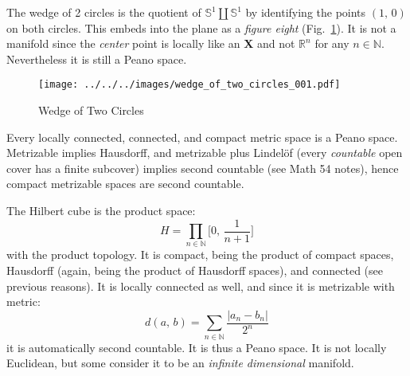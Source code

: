 \documentclass{article}
\theoremstyle{plain}
\theoremstyle{normal}
\newenvironment{example}{%
    \pushQED{\qed}\renewcommand{\qedsymbol}{$\blacksquare$}\examplex%
}{%
    \popQED\endexamplex%
}
\begin{document}
        \begin{example}
            The wedge of 2 circles is the quotient of
            $\mathbb{S}^{1}\coprod\mathbb{S}^{1}$ by identifying the points
            $(1,\,0)$ on both circles. This embeds into the plane as a
            \textit{figure eight} (Fig.~\ref{fig:wedge_of_two_circles_001}).
            It is not a manifold since the \textit{center} point is locally
            like an \textbf{X} and not $\mathbb{R}^{n}$ for any
            $n\in\mathbb{N}$. Nevertheless it is still a Peano space.
        \end{example}
        \begin{figure}
            \centering
            \texttt{[image: ../../../images/wedge\_of\_two\_circles\_001.pdf]}
            \caption{Wedge of Two Circles}
            \label{fig:wedge_of_two_circles_001}
        \end{figure}
        \begin{example}
            Every locally connected, connected, and compact metric space is a
            Peano space. Metrizable implies Hausdorff, and
            metrizable plus Lindel\"{o}f (every \textit{countable} open cover
            has a finite subcover) implies second countable (see Math 54 notes),
            hence compact metrizable spaces are second countable.
        \end{example}
        \begin{example}
            The Hilbert cube is the product space:
            \begin{equation}
                H=\prod_{n\in\mathbb{N}}\big[0,\,\frac{1}{n+1}\big]
            \end{equation}
            with the product topology. It is compact, being the product of
            compact spaces, Hausdorff (again, being the product of Hausdorff
            spaces), and connected (see previous reasons). It is locally
            connected as well, and since it is metrizable with metric:
            \begin{equation}
                d(a,\,b)=
                \sum_{n\in\mathbb{N}}\frac{|a_{n}-b_{n}|}{2^{n}}
            \end{equation}
            it is automatically second countable. It is thus a Peano
            space. It is not locally Euclidean, but some consider
            it to be an \textit{infinite dimensional} manifold.
        \end{example}
\end{document}
